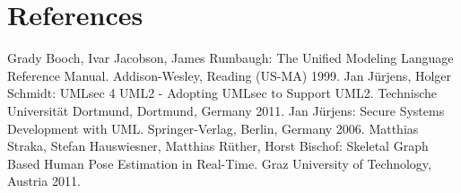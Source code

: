 \documentclass{acmtog} %
\begin{document}
\section{References}
\renewcommand{\section}[2]{}
\begin{raggedright}%
\begin{thebibliography}{X}
	 Grady Booch, Ivar Jacobson, James Rumbaugh: The Unified Modeling Language Reference Manual. Addison-Wesley, Reading (US-MA) 1999.
	 Jan Jürjens, Holger Schmidt: UMLsec 4 UML2 - Adopting UMLsec to Support UML2. Technische Universität Dortmund, Dortmund, Germany 2011.
	 Jan Jürjens: Secure Systems Development with UML. Springer-Verlag, Berlin, Germany 2006.
	 Matthias Straka, Stefan Hauswiesner, Matthias Rüther, Horst Bischof: Skeletal Graph Based Human Pose Estimation in Real-Time. Graz University of Technology, Austria 2011.
\end{thebibliography}
\end{raggedright}
\end{document}
